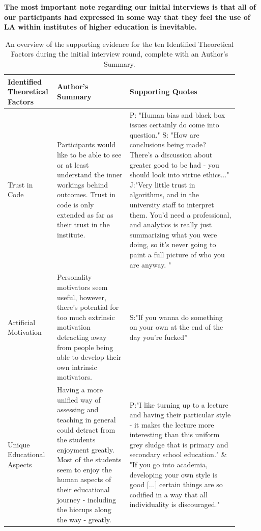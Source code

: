 \documentclass{l4proj}
\begin{document}
\textbf{The most important note regarding our initial interviews is that all of our participants had expressed in some way that they feel the use of LA within institutes of higher education is inevitable. }


\begin{longtable}
{p{0.15\linewidth} | p{0.30\linewidth} | p{0.45\linewidth}}
\caption{An overview of the supporting evidence for the ten Identified Theoretical Factors during the initial interview round, complete with an Author's Summary.} \label{Analysis:Identification of Theoretical Factors} \\
\toprule
Identified Theoretical Factors &
  Author's Summary &
  Supporting Quotes \\ \midrule
Trust in Code &
  Participants would like to be able to see or at least understand the inner workings behind outcomes. Trust in code is only extended as far as their trust in the institute. &
  P: "Human bias and black box issues certainly do come into question."  \newline
  S: "How are conclusions being made? There's a discussion about greater good to be had - you should look into virtue ethics..."  \newline
  J:"Very little trust in algorithms, and in the university staff to interpret them. You’d need a professional, and analytics is really just summarizing what you were doing, so it’s never going to paint a full picture of who you are anyway. " \newline\\
Artificial Motivation &
  Personality motivators seem useful, however, there’s potential for too much extrinsic motivation detracting away from people being able to develop their own intrinsic motivators. \newline &
  S:"If you wanna do something on your own at the end of the day you’re fucked” \newline\\
Unique Educational Aspects &
  Having a more unified way of assessing and teaching in general could detract from the students enjoyment greatly. Most of the students seem to enjoy the human aspects of their educational journey - including the hiccups along the way - greatly. &
  P:"I like turning up to a lecture and having their particular style - it makes the lecture more interesting than this uniform grey sludge that is primary and secondary school education." \& "If you go into academia, developing your own style is good [...] certain things are so codified in a way that all individuality is discouraged." \newline

\end{longtable}
\end{document}
